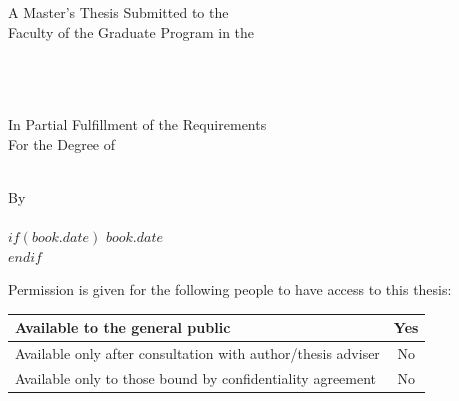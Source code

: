 \frontmatter %

\pagestyle{plain} %


\begin{titlepage}
\begin{center}


{\Large\ttitle\par} %
\vspace{4ex}

\large {A Master's Thesis Submitted to the\\ Faculty of the Graduate Program in the}\\%
\large\groupname\\ %
\large\deptname\\ %
\large\univname\\ %
\vspace{4ex}

\large {In Partial Fulfillment of the Requirements}\\
\large {For the Degree of}\\
\large\degreename\\ %
\vspace{5ex}

\large{By}\\
\large\authorname\\
$if(book.date)$
{\large $book.date$}\\ %
$endif$
\vspace{6ex}

\small{Permission is given for the following people to have access to this thesis:}
\vspace{1ex}
\begin{tabular}{|>{\small\centering\arraybackslash}p{14cm}|c|}
    \hline
    Available to the general public                              & \small Yes \\ \hline
    Available only after consultation with author/thesis adviser & \small No  \\ \hline
    Available only to those bound by confidentiality agreement   & \small No  \\ \hline
\end{tabular}


\end{center}
\end{titlepage}
